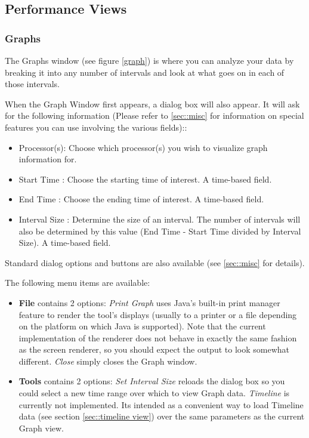 \documentclass[10pt]{article}
\begin{document}
\subsection{Performance Views}

\subsubsection{Graphs}
\label{sec::graph view}


The Graphs window (see figure \ref{graph}) is where you can analyze your data by breaking it
into any number of intervals and look at what goes on in each of those
intervals.


When the Graph Window first appears, a dialog box will also appear. It
will ask for the following information (Please refer to
\ref{sec::misc} for information on special features you can
use involving the various fields)::

\begin{itemize}
\item
Processor(s): Choose which processor(s) you wish to visualize graph 
information for.
\item
Start Time : Choose the starting time of interest. A time-based field.
\item
End Time : Choose the ending time of interest. A time-based field.
\item
Interval Size : Determine the size of an interval. The number of intervals
will also be determined by this value (End Time - Start Time divided by
Interval Size). A time-based field.
\end{itemize}

Standard \projections{} dialog options and buttons are also available
(see \ref{sec::misc} for details).

The following menu items are available:

\begin{itemize}
\item
{\bf File} contains 2 options: {\it Print Graph} uses Java's built-in 
print manager feature to render the tool's displays (usually to a printer 
or a file depending on the platform on which Java is supported). Note that
the current implementation of the renderer does not behave in exactly the
same fashion as the screen renderer, so you should expect the output to look
somewhat different. {\it Close} simply closes the Graph window.
\item
{\bf Tools} contains 2 options: {\it Set Interval Size} reloads the dialog
box so you could select a new time range over which to view Graph data.
{\it Timeline} is currently not implemented. Its intended as a convenient
way to load Timeline data (see section \ref{sec::timeline view}) over the 
same parameters as the current Graph view.
\end{itemize}
\end{document}

